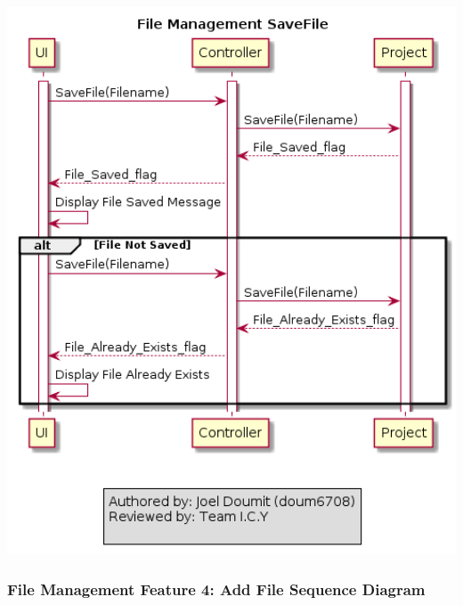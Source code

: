 \documentclass[twoside,letterpaper]{article}
\begin{document}
	\includegraphics[width=6.0in]{images/SequenceDiagrams/FM_SaveFile_Image}
	
	\newpage
	
	\subsubsection[File Management Feature 4: Add File Sequence Diagram]{\rmfamily\bfseries\color{black}
		File Management Feature 4: Add File Sequence Diagram}
	\hypertarget{RefHeading22059017292}{}
	
\end{document}

